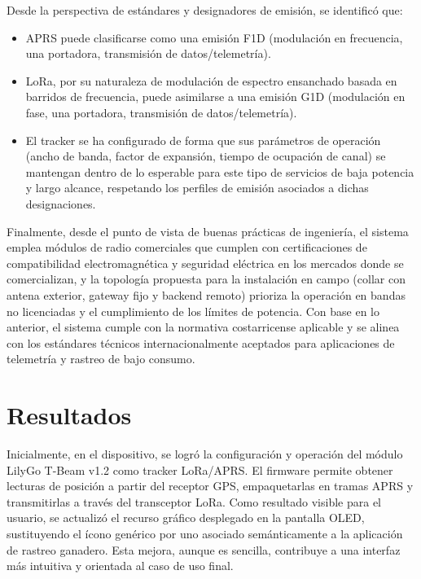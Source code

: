 \documentclass[journal]{IEEEtran}
\begin{document}
Desde la perspectiva de estándares y designadores de emisión, se identificó que:

\begin{itemize}

\item APRS puede clasificarse como una emisión F1D (modulación en frecuencia, una portadora, transmisión de datos/telemetría).

\item LoRa, por su naturaleza de modulación de espectro ensanchado basada en barridos de frecuencia, puede asimilarse a una emisión G1D (modulación en fase, una portadora, transmisión de datos/telemetría).

\item El tracker se ha configurado de forma que sus parámetros de operación (ancho de banda, factor de expansión, tiempo de ocupación de canal) se mantengan dentro de lo esperable para este tipo de servicios de baja potencia y largo alcance, respetando los perfiles de emisión asociados a dichas designaciones.

\end{itemize}

Finalmente, desde el punto de vista de buenas prácticas de ingeniería, el sistema emplea módulos de radio comerciales que cumplen con certificaciones de compatibilidad electromagnética y seguridad eléctrica en los mercados donde se comercializan, y la topología propuesta para la instalación en campo (collar con antena exterior, gateway fijo y backend remoto) prioriza la operación en bandas no licenciadas y el cumplimiento de los límites de potencia. Con base en lo anterior, el sistema cumple con la normativa costarricense aplicable y se alinea con los estándares técnicos internacionalmente aceptados para aplicaciones de telemetría y rastreo de bajo consumo.

\section{Resultados}

Inicialmente, en el dispositivo, se logró la configuración y operación del módulo LilyGo T-Beam v1.2 como tracker LoRa/APRS. El firmware permite obtener lecturas de posición a partir del receptor GPS, empaquetarlas en tramas APRS y transmitirlas a través del transceptor LoRa. Como resultado visible para el usuario, se actualizó el recurso gráfico desplegado en la pantalla OLED, sustituyendo el ícono genérico por uno asociado semánticamente a la aplicación de rastreo ganadero. Esta mejora, aunque es sencilla, contribuye a una interfaz más intuitiva y orientada al caso de uso final.
\end{document}
